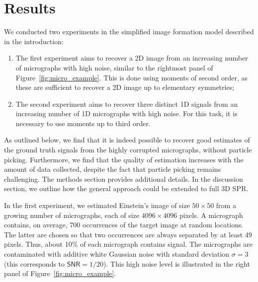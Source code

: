 \documentclass[english,11pt]{article}
\newcommand{\1}{\mathbf{1}}
\newcommand{\TODO}[1]{{\color{red}{[#1]}}}
\numberwithin{equation}{section}
\theoremstyle{plain}
\theoremstyle{definition}
\theoremstyle{remark}
\theoremstyle{plain}
\theoremstyle{remark}
\theoremstyle{plain}
\theoremstyle{plain}
\newcommand{\SNR}{\ensuremath{\textsf{SNR}}}
\begin{document}
\section{Results} \label{sec:results}


We conducted two experiments in the simplified image formation model described in the introduction:
\begin{enumerate}
	\item The first experiment aims to recover a 2D image from an increasing number of micrographs with high noise, similar to the rightmost panel of Figure~\ref{fig:micro_example}. This is done using moments of \TODO{first and} second order, as these are sufficient to recover a 2D image up to elementary symmetries;
	\item The second experiment aims to recover three distinct 1D signals from an increasing number of 1D micrographs with high noise. For this task, it is necessary to use moments up to third order.
\end{enumerate}
As outlined below, we find that it is indeed possible to recover good estimates of the ground truth signals from the highly corrupted micrographs, without particle picking. Furthermore, we find that the quality of estimation increases with the amount of data collected, despite the fact that particle picking remains challenging. The methods section provides additional details. In the discussion section, we outline how the general approach could be extended to full 3D SPR.



In the first experiment, we estimated Einstein's image of size $50\times 50$ from a growing number of micrographs, each of size $4096\times 4096$ pixels. A micrograph contains, on average, 700 occurrences of the target image at random locations. The latter are chosen so that two occurrences are always separated by at least 49 pixels. Thus, about 10\% of each micrograph contains signal. The micrographs are contaminated with additive white Gaussian noise with standard deviation $\sigma=3$ (this corresponds to $\SNR=1/20$). This high noise level is illustrated in the right panel of Figure~\ref{fig:micro_example}.
\end{document}
